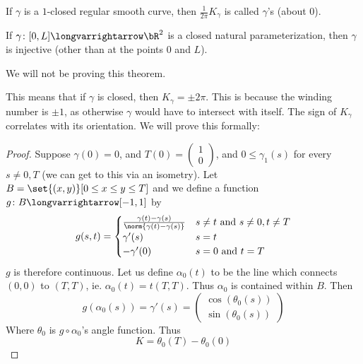 \documentclass[10pt]{article}
\def\pmat#1{\begin{pmatrix} #1 \end{pmatrix}}
\def\pmat#1{\begin{pmatrix}#1\end{pmatrix}}
\let\longto=\longvarrightarrow
\begin{document}
\begin{defn*}

    If $\gamma$ is a $1$-closed regular smooth curve, then $\frac1{2\pi}K_\gamma$ is called $\gamma$'s  (about $0$).

\end{defn*}

\begin{thrm*}

    If $\gamma\colon[0,L]\longto\bR^2$ is a closed natural parameterization, then $\gamma$ is injective (other than at the points $0$ and $L$).

\end{thrm*}

We will not be proving this theorem.

This means that if $\gamma$ is closed, then $K_\gamma=\pm2\pi$.
This is because the winding number is $\pm1$, as otherwise $\gamma$ would have to intersect with itself.
The sign of $K_\gamma$ correlates with its orientation.
We will prove this formally:

\begin{proof}

    Suppose $\gamma(0)=0$, and $T(0)=\pmat{1\\0}$, and $0\leq\gamma_1(s)$ for every $s\neq0,T$ (we can get to this via an isometry).
    Let $B=\set{(x,y)}[0\leq x\leq y\leq T]$ and we define a function $g\colon B\longto[-1,1]$ by
    \[ g(s,t) = \begin{cases} \frac{\gamma(t)-\gamma(s)}{\norm{\gamma(t)-\gamma(s)}} & s\neq t\text{ and } s\neq0,t\neq T \\ \gamma'(s) & s=t \\ -\gamma'(0) & s=0\text{ and }t=T \end{cases} \]
    $g$ is therefore continuous.
    Let us define $\alpha_0(t)$ to be the line which connects $(0,0)$ to $(T,T)$, ie. $\alpha_0(t)=t(T,T)$.
    Thus $\alpha_0$ is contained within $B$.
    Then
    \[ g(\alpha_0(s)) = \gamma'(s) = \pmat{\cos(\theta_0(s)) \\ \sin(\theta_0(s))} \]
    Where $\theta_0$ is $g\circ\alpha_0$'s angle function.
    Thus
    \[ K = \theta_0(T) - \theta_0(0) \]

\end{proof}
\end{document}
